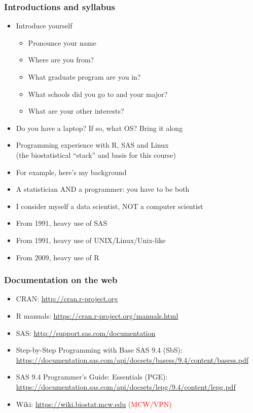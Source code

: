 \documentclass[11pt,pdftex,dvipsnames,usenames,helvetica]{beamer}
\begin{document}
\begin{frame}
\frametitle{Introductions and syllabus}

\begin{itemize}
\item Introduce yourself
\begin{itemize}
\item Pronounce your name
\item Where are you from?
\item What graduate program are you in?
\item What schools did you go to and your major?
\item What are your other interests?
\end{itemize}
\item Do you have a laptop?  If so, what OS?  Bring it along
\item Programming experience with R, SAS and Linux\\ %
(the biostatistical ``stack'' and basis for this course)
\item For example, here's my background
\item A statistician AND a programmer: you have to be both
\item I consider myself a data scientist, NOT a computer scientist
\item From 1991,  heavy use of SAS
\item From 1991,  heavy use of UNIX/Linux/Unix-like
\item From 2009,  heavy use of R
\end{itemize}

\end{frame}

\begin{frame}
\frametitle{Documentation on the web}

\begin{itemize}
\item CRAN: \url{http://cran.r-project.org}
\item R manuals: \url{https://cran.r-project.org/manuals.html}
\item SAS: \url{http://support.sas.com/documentation}
\item Step-by-Step Programming with Base SAS 9.4 (SbS): \\
\url{https://documentation.sas.com/api/docsets/basess/9.4/content/basess.pdf}
\item SAS 9.4 Programmer’s Guide: Essentials (PGE): \\
\url{https://documentation.sas.com/api/docsets/lepg/9.4/content/lepg.pdf}
\item Wiki: \url{https://wiki.biostat.mcw.edu} \textcolor{red}{(MCW/VPN)}
\end{itemize}

\end{frame}
\end{document}
